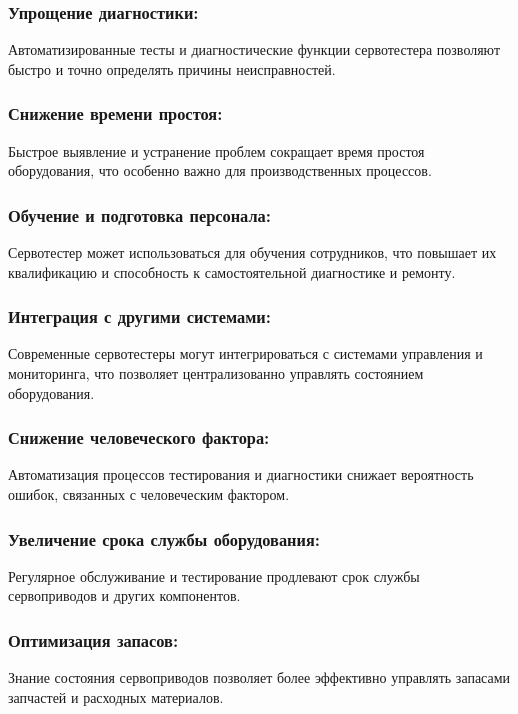 \documentclass[a4paper]{bsuir-tor}
\begin{document}
  \subsubsection{Упрощение диагностики: }
  Автоматизированные тесты и диагностические функции сервотестера
  позволяют быстро и точно определять причины неисправностей.

  \subsubsection{Снижение времени простоя: }
  Быстрое выявление и устранение проблем сокращает время простоя
  оборудования, что особенно важно для производственных процессов.

  \subsubsection{Обучение и подготовка персонала: }
  Сервотестер может использоваться для обучения сотрудников, что
  повышает их квалификацию и способность к самостоятельной диагностике и
  ремонту.

  \subsubsection{Интеграция с другими системами: }
  Современные сервотестеры могут интегрироваться с системами
  управления и мониторинга, что позволяет централизованно управлять
  состоянием оборудования.
  
  \subsubsection{Снижение человеческого фактора: }
  Автоматизация процессов тестирования и диагностики снижает вероятность
  ошибок, связанных с человеческим фактором.

  \subsubsection{Увеличение срока службы оборудования: }
  Регулярное обслуживание и тестирование продлевают срок службы
  сервоприводов и других компонентов.

  \subsubsection{Оптимизация запасов: }
  Знание состояния сервоприводов позволяет более эффективно управлять
  запасами запчастей и расходных материалов.
\end{document}
